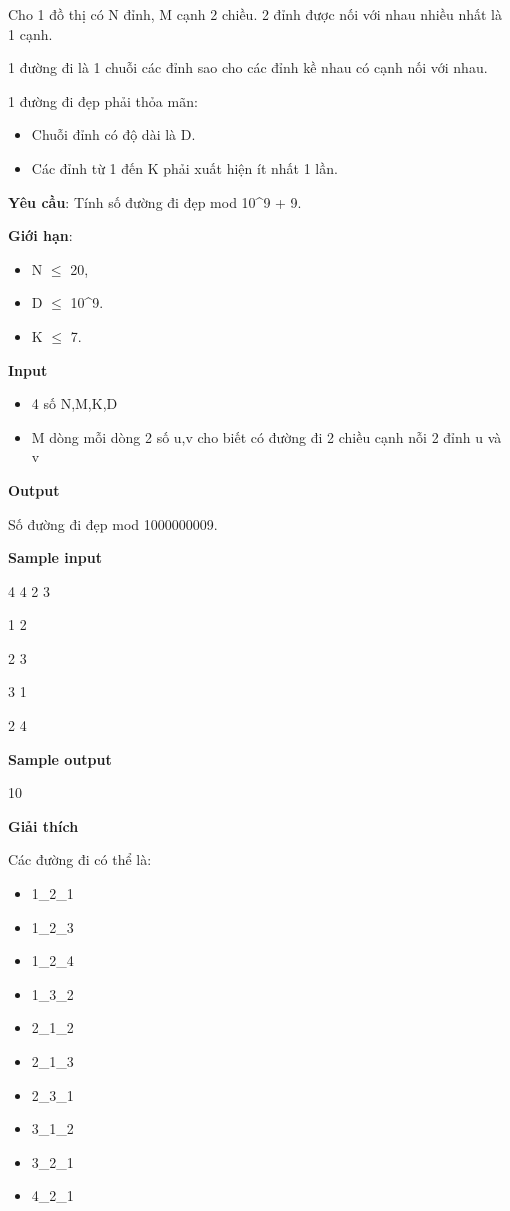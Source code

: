 

Cho 1 đồ thị có N đỉnh, M cạnh 2 chiều. 2 đỉnh được nối với nhau nhiều nhất là 1 cạnh.

1 đường đi là 1 chuỗi các đỉnh sao cho các đỉnh kề nhau có cạnh nối với nhau.

1 đường đi đẹp phải thỏa mãn:
\begin{itemize}
	\item Chuỗi đỉnh có độ dài là D.
	\item Các đỉnh từ 1 đến K phải xuất hiện ít nhất 1 lần.
\end{itemize}

\textbf{Yêu cầu}: Tính số đường đi đẹp mod 10\textasciicircum9 + 9.

\textbf{Giới hạn}:
\begin{itemize}
	\item N  $\le$  20,
	\item D  $\le$  10\textasciicircum9.
	\item K  $\le$  7.
\end{itemize}

\textbf{Input}
\begin{itemize}
	\item 4 số N,M,K,D
	\item M dòng mỗi dòng 2 số u,v cho biết có đường đi 2 chiều cạnh nỗi 2 đỉnh u và v
\end{itemize}

\textbf{Output}

Số đường đi đẹp mod 1000000009.

\textbf{Sample input}

4 4 2 3

1 2

2 3

3 1

2 4

\textbf{Sample output}

10

\textbf{Giải thích}

Các đường đi có thể là:
\begin{itemize}
	\item 1\_2\_1
	\item 1\_2\_3
	\item 1\_2\_4
	\item 1\_3\_2
	\item 2\_1\_2
	\item 2\_1\_3
	\item 2\_3\_1
	\item 3\_1\_2
	\item 3\_2\_1
	\item 4\_2\_1
\end{itemize}

 

 

 

 
